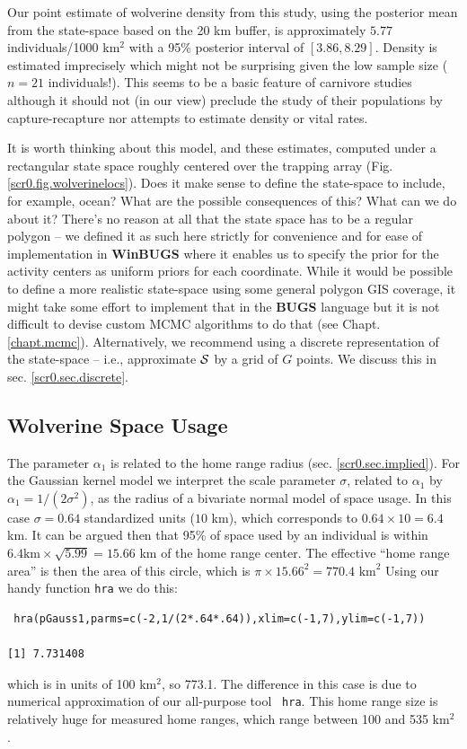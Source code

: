 Our point estimate of wolverine density from this study, using the
posterior mean from the state-space based on the 20 km buffer, is
approximately $5.77$ individuals/1000 km$^2$ with a 95\% posterior
interval of $[3.86, 8.29]$. Density is estimated imprecisely which
might not be surprising given the low sample size ($n=21$
individuals!). This seems to be a basic feature of carnivore studies
although it should not (in our view) preclude the study of their
populations by capture-recapture nor attempts to estimate density or vital rates.


It is worth thinking about this model, and these estimates, computed
under a rectangular state space roughly centered over the trapping
array (Fig. \ref{scr0.fig.wolverinelocs}).  Does it make sense to
define the state-space to include, for example, ocean? What are the
possible consequences of this? What can we do about it?  There's no
reason at all that the state space has to be a regular polygon -- we
defined it as such here strictly for convenience and for ease of
implementation in {\bf WinBUGS} where it enables us to specify the
prior for the activity centers as uniform priors for each coordinate.
While it would be possible to define a more realistic state-space
using some general polygon GIS coverage, it might take some effort to
implement that in the {\bf BUGS} language but it is not difficult to
devise custom MCMC algorithms to do that (see
Chapt. \ref{chapt.mcmc}).  Alternatively, we recommend using a
discrete representation of the state-space -- i.e., approximate ${\cal
  S}$ by a grid of $G$ points. We discuss this in sec.
\ref{scr0.sec.discrete}.

\subsection{Wolverine Space Usage}

The parameter $\alpha_{1}$ is related to the home range radius
(sec. \ref{scr0.sec.implied}).  For the Gaussian kernel model we
interpret the scale parameter $\sigma$, related to $\alpha_1$ by
$\alpha_1 = 1/(2\sigma^2)$, as the radius of a bivariate normal model
of space usage.  In this case $\sigma = 0.64$ standardized units ($10$
km), which corresponds to $0.64 \times 10 = 6.4$ km.  It can be
argued then that 95\% of space used by an individual is within $6.4
\mbox{km} \times \sqrt{5.99} = 15.66$ km of the home range center. The
effective ``home range area'' is then the area of this circle, which is
$\pi \times 15.66^2 = 770.4$ $\mbox{km}^{2}$
Using our handy function \mbox{\tt hra} we do this:
\begin{verbatim}
 hra(pGauss1,parms=c(-2,1/(2*.64*.64)),xlim=c(-1,7),ylim=c(-1,7))

[1] 7.731408
\end{verbatim}
which is in units of 100 km$^2$, so 773.1. The difference in this case
is due to numerical approximation of our all-purpose tool \mbox{\tt
  hra}. This home range size is
relatively huge for measured home ranges, which range between
100 and 535 km$^2$ \citep{whitman_etal:1986}.

